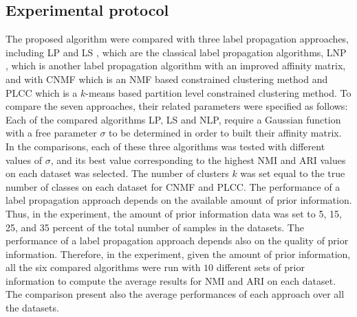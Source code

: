 \documentclass[conference]{IEEEtran}
\begin{document}
\subsection{Experimental protocol}
The proposed algorithm were compared with three label propagation approaches, including LP \cite{zhou2003learning} and LS \cite{zhu2002learning}, which are the classical label propagation algorithms, LNP \cite{wang2007label}, which is another label propagation algorithm with an improved affinity matrix, and with CNMF\cite{liu2010non} which is an NMF based constrained clustering method and PLCC \cite{liu2017partition} which is a $k$-means based partition level constrained clustering method. To compare the seven approaches, their related parameters were specified as follows: Each of the compared algorithms LP, LS and NLP, require a Gaussian function with a free parameter $\sigma$ to be determined in order to built their affinity matrix. 
In the comparisons, each of these three algorithms was tested with different values of $\sigma$, and its best value corresponding to the highest NMI and ARI values on each dataset was selected. The number of clusters $k$ was set equal to the true number of classes on each dataset for CNMF and PLCC. The performance of a label propagation approach depends on the available amount of prior information. Thus, in the experiment, the amount of prior information data was set to 5, 15, 25, and 35 percent of the total number of samples in the datasets. The performance of a label propagation approach depends also on the quality of prior information. Therefore, in the experiment, given the amount of prior information, all the six compared algorithms were run with $10$ different sets of prior information to compute the average results for NMI and ARI on each dataset. The comparison present also the average performances of each approach over all the datasets.
\end{document}
